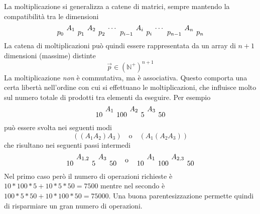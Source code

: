 La moltiplicazione si generalizza a catene di matrici, sempre mantendo la compatibilità tra le dimensioni
\begin{equation*}
\begingroup
\setlength{\arraycolsep}{2pt} %
\renewcommand{\arraystretch}{0.5} %
    \begin{array}[h]{ccccccccccccc}
            & A_1 &     & A_2 &     & \cdots &         & A_i &     & \cdots &         & A_n &   \\%
        p_0 &     & p_1 &     & p_2 &        & p_{i-1} &     & p_i &        & p_{n-1} &     & p_n
    \end{array}
\endgroup
\end{equation*}
La catena di moltiplicazioni può quindi essere rappresentata da un array di $n+1$ dimensioni (massime) distinte
\begin{equation*}
    \vec{p} \in \left( \mathbb{N}^+ \right)^{n+1}
\end{equation*}
La moltiplicazione \emph{non} è commutativa, ma è associativa. Questo comporta una certa libertà nell'ordine con cui si effettuano le moltiplicazioni, che influisce molto sul numero totale di prodotti tra elementi da eseguire. Per esempio
\begin{equation*}
\begingroup
\setlength{\arraycolsep}{2pt} %
\renewcommand{\arraystretch}{0.5} %
    \begin{array}[h]{ccccccc}
           & A_1 &     & A_2 &   & A_3 &   \\  
        10 &     & 100 &     & 5 &     & 50
    \end{array}
\endgroup
\end{equation*}
può essere svolta nei seguenti modi 
\begin{equation*}
\left( \left( A_1 A_2 \right) A_3 \right)
\quad
\text{o}
\quad
\left( A_1 \left( A_2 A_3 \right) \right)
\end{equation*}
che risultano nei seguenti passi intermedi
\begin{equation*}
\begingroup
\setlength{\arraycolsep}{2pt} %
\renewcommand{\arraystretch}{0.5} %
    \begin{array}[h]{ccccccc}
           & A_{1,2} &   & A_3 &   \\  
        10 &         & 5 &     & 50
    \end{array}
\quad
\text{o}
\quad
    \begin{array}[h]{ccccccc}
           & A_{1} &     & A_{2,3} &   \\  
        10 &       & 100 &         & 50
    \end{array}
\endgroup
\end{equation*}
Nel primo caso però il numero di operazioni richieste è $10 * 100 * 5 + 10 * 5 * 50 = 7500$
mentre nel secondo è $100 * 5 * 50 + 10 * 100 * 50 = 75000$. Una buona parentesizzazione permette quindi di risparmiare un gran numero di operazioni.

